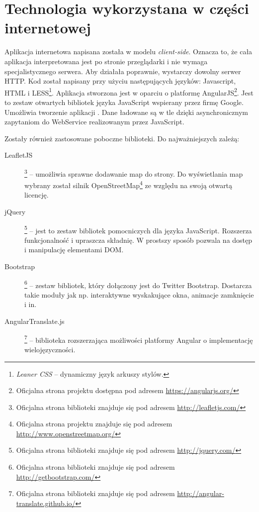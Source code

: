 \documentclass{book}
\begin{document}
		\section{Technologia wykorzystana w części internetowej} 
			
		Aplikacja internetowa napisana została w modelu \emph{client-side}. Oznacza to, że cała aplikacja interpretowana jest po stronie przeglądarki i nie wymaga specjalistycznego serwera. Aby działała poprawnie, wystarczy dowolny serwer HTTP. Kod został napisany przy użyciu następujących języków: Javascript, HTML i LESS\footnote{\emph{Leaner CSS} -- dynamiczny język arkuszy stylów.}. 
		Aplikacja stworzona jest w oparciu o platformę AngularJS\footnote{Oficjalna strona projektu dostępna pod adresem \url{https://angularjs.org/}}. Jest to zestaw otwartych bibliotek języka JavaScript wspierany przez firmę Google. Umożliwia tworzenie aplikacji . Dane ładowane są w tle dzięki asynchronicznym zapytaniom do WebService realizowanym przez JavaScript.
		
		Zostały również zastosowane poboczne biblioteki. Do najważniejszych zależą:
		
		\begin{description}
			
			\item[LeafletJS]\footnote{Oficjalna strona biblioteki znajduje się pod adresem \url{http://leafletjs.com/}} -- 
			umożliwia sprawne dodawanie map do strony. Do wyświetlania map wybrany został silnik OpenStreetMap\footnote{Oficjalna strona projektu znajduje się pod adresem \url{http://www.openstreetmap.org/}} ze względu na swoją otwartą licencję.
			\item[jQuery]\footnote{Oficjalna strona biblioteki znajduje się pod adresem \url{http://jquery.com/}} -- 
			jest to zestaw bibliotek pomocniczych dla języka JavaScript. Rozszerza funkcjonalność i upraszcza składnię. W prostszy sposób pozwala na dostęp i manipulację elementami DOM.
			\item[Bootstrap]\footnote{Oficjalna strona biblioteki znajduje się pod adresem \url{http://getbootstrap.com/}} -- 
			zestaw bibliotek, który dołączony jest do Twitter Bootstrap. Dostarcza takie moduły jak np. interaktywne wyskakujące okna, animacje zamknięcie i in.
			\item[AngularTranslate.js]\footnote{Oficjalna strona biblioteki znajduje się pod adresem \url{http://angular-translate.github.io/}} -- 
			biblioteka rozszerzająca możliwości platformy Angular o implementację wielojęzyczności.  
		
		\end{description}
				
\end{document}
